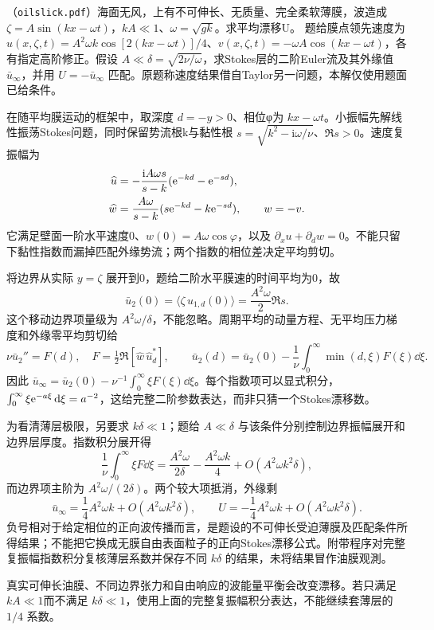 \begin{exercise}\label{task:fluid-oilslick}
（\texttt{oilslick.pdf}）海面无风，上有不可伸长、无质量、完全柔软薄膜，波造成 $\zeta=A\sin(kx-\omega t)$，$kA\ll1$、$\omega=\sqrt{gk}$。求平均漂移U。
题给膜点领先速度为 $u(x,\zeta,t)=A^2\omega k\cos[2(kx-\omega t)]/4$、$v(x,\zeta,t)=-\omega A\cos(kx-\omega t)$，各有指定高阶修正。假设 $A\ll\delta=\sqrt{2\nu/\omega}$，求Stokes层的二阶Euler流及其外缘值 $\bar u_\infty$，并用 $U=-\bar u_\infty$ 匹配。原题称速度结果借自Taylor另一问题，本解仅使用题面已给条件。
\end{exercise}
\begin{solution}
在随平均膜运动的框架中，取深度 $d=-y>0$、相位φ为 $kx-\omega t$。小振幅先解线性振荡Stokes问题，同时保留势流根k与黏性根 $s=\sqrt{k^2-\mathrm i\omega/\nu}$、$\Re s>0$。速度复振幅为
\begin{align*}
 \widehat u&=-\frac{\mathrm iA\omega s}{s-k}(\mathrm e^{-kd}-\mathrm e^{-sd}),\\
 \widehat w&=\frac{A\omega}{s-k}(s\mathrm e^{-kd}-k\mathrm e^{-sd}),\qquad w=-v.
\end{align*}
它满足壁面一阶水平速度0、$w(0)=A\omega\cos\varphi$，以及 $\partial_xu+\partial_dw=0$。不能只留下黏性指数而漏掉匹配外缘势流；两个指数的相位差决定平均剪切。

将边界从实际 $y=\zeta$ 展开到0，题给二阶水平膜速的时间平均为0，故
\[
 \bar u_2(0)=\langle\zeta\,u_{1,d}(0)\rangle
            =\frac{A^2\omega}{2}\Re s.
\]
这个移动边界项量级为 $A^2\omega/\delta$，不能忽略。周期平均的动量方程、无平均压力梯度和外缘零平均剪切给
\[
 \nu\bar u_2''=F(d),\quad
 F=\tfrac12\Re[\widehat w\,\widehat u_d^*],\qquad
 \bar u_2(d)=\bar u_2(0)-\frac1\nu\int_0^\infty\min(d,\xi)F(\xi)\dd\xi.
\]
因此 $\bar u_\infty=\bar u_2(0)-\nu^{-1}\int_0^\infty\xi F(\xi)\dd\xi$。每个指数项可以显式积分，$\int_0^\infty\xi\mathrm e^{-a\xi}\,\mathrm d\xi=a^{-2}$，这给完整二阶参数表达，而非只猜一个Stokes漂移数。

为看清薄层极限，另要求 $k\delta\ll1$；题给 $A\ll\delta$ 与该条件分别控制边界振幅展开和边界层厚度。指数积分展开得
\[
 \frac1\nu\int_0^\infty\xi F\dd\xi
 =\frac{A^2\omega}{2\delta}-\frac{A^2\omega k}{4}
   +O(A^2\omega k^2\delta),
\]
而边界项主阶为 $A^2\omega/(2\delta)$。两个较大项抵消，外缘剩
\[
 \bar u_\infty=\frac14A^2\omega k+O(A^2\omega k^2\delta),\qquad
 U=-\frac14A^2\omega k+O(A^2\omega k^2\delta).
\]
负号相对于给定相位的正向波传播而言，是题设的不可伸长受迫薄膜及匹配条件所得结果；不能把它换成无膜自由表面粒子的正向Stokes漂移公式。附带程序对完整复振幅指数积分复核薄层系数并保存不同 $k\delta$ 的结果，未将结果冒作油膜观測。

真实可伸长油膜、不同边界张力和自由响应的波能量平衡会改变漂移。若只满足 $kA\ll1$而不满足 $k\delta\ll1$，使用上面的完整复振幅积分表达，不能继续套薄层的 $1/4$ 系数。
\end{solution}

